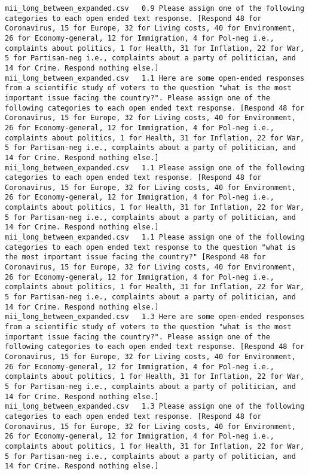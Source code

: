 \begin{lstlisting}[label=lst:promptvariants]
mii_long_between_expanded.csv	0.9	Please assign one of the following categories to each open ended text response. [Respond 48 for Coronavirus, 15 for Europe, 32 for Living costs, 40 for Environment, 26 for Economy-general, 12 for Immigration, 4 for Pol-neg i.e., complaints about politics, 1 for Health, 31 for Inflation, 22 for War, 5 for Partisan-neg i.e., complaints about a party of politician, and 14 for Crime. Respond nothing else.]
mii_long_between_expanded.csv	1.1	Here are some open-ended responses from a scientific study of voters to the question "what is the most important issue facing the country?". Please assign one of the following categories to each open ended text response. [Respond 48 for Coronavirus, 15 for Europe, 32 for Living costs, 40 for Environment, 26 for Economy-general, 12 for Immigration, 4 for Pol-neg i.e., complaints about politics, 1 for Health, 31 for Inflation, 22 for War, 5 for Partisan-neg i.e., complaints about a party of politician, and 14 for Crime. Respond nothing else.]
mii_long_between_expanded.csv	1.1	Please assign one of the following categories to each open ended text response. [Respond 48 for Coronavirus, 15 for Europe, 32 for Living costs, 40 for Environment, 26 for Economy-general, 12 for Immigration, 4 for Pol-neg i.e., complaints about politics, 1 for Health, 31 for Inflation, 22 for War, 5 for Partisan-neg i.e., complaints about a party of politician, and 14 for Crime. Respond nothing else.]
mii_long_between_expanded.csv	1.1	Please assign one of the following categories to each open ended text response to the question "what is the most important issue facing the country?" [Respond 48 for Coronavirus, 15 for Europe, 32 for Living costs, 40 for Environment, 26 for Economy-general, 12 for Immigration, 4 for Pol-neg i.e., complaints about politics, 1 for Health, 31 for Inflation, 22 for War, 5 for Partisan-neg i.e., complaints about a party of politician, and 14 for Crime. Respond nothing else.]
mii_long_between_expanded.csv	1.3	Here are some open-ended responses from a scientific study of voters to the question "what is the most important issue facing the country?". Please assign one of the following categories to each open ended text response. [Respond 48 for Coronavirus, 15 for Europe, 32 for Living costs, 40 for Environment, 26 for Economy-general, 12 for Immigration, 4 for Pol-neg i.e., complaints about politics, 1 for Health, 31 for Inflation, 22 for War, 5 for Partisan-neg i.e., complaints about a party of politician, and 14 for Crime. Respond nothing else.]
mii_long_between_expanded.csv	1.3	Please assign one of the following categories to each open ended text response. [Respond 48 for Coronavirus, 15 for Europe, 32 for Living costs, 40 for Environment, 26 for Economy-general, 12 for Immigration, 4 for Pol-neg i.e., complaints about politics, 1 for Health, 31 for Inflation, 22 for War, 5 for Partisan-neg i.e., complaints about a party of politician, and 14 for Crime. Respond nothing else.]

\end{lstlisting}
